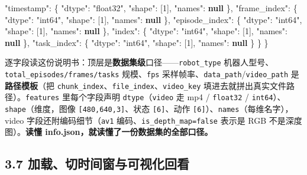 \documentclass[
  chinese,
]{ctexart}
\newenvironment{Shaded}{\begin{snugshade}}{\end{snugshade}}
\newcommand{\DataTypeTok}[1]{\textcolor[rgb]{0.68,0.00,0.00}{#1}}
\newcommand{\DecValTok}[1]{\textcolor[rgb]{0.68,0.00,0.00}{#1}}
\newcommand{\FunctionTok}[1]{\textcolor[rgb]{0.28,0.35,0.67}{#1}}
\newcommand{\KeywordTok}[1]{\textcolor[rgb]{0.00,0.23,0.31}{\textbf{#1}}}
\newcommand{\OtherTok}[1]{\textcolor[rgb]{0.00,0.23,0.31}{#1}}
\newcommand{\StringTok}[1]{\textcolor[rgb]{0.13,0.47,0.30}{#1}}
\begin{document}
\begin{Shaded}
\begin{Highlighting}[]
    \DataTypeTok{"timestamp"}\FunctionTok{:}     \FunctionTok{\{} \DataTypeTok{"dtype"}\FunctionTok{:} \StringTok{"float32"}\FunctionTok{,} \DataTypeTok{"shape"}\FunctionTok{:} \OtherTok{[}\DecValTok{1}\OtherTok{]}\FunctionTok{,} \DataTypeTok{"names"}\FunctionTok{:} \KeywordTok{null} \FunctionTok{\},}
    \DataTypeTok{"frame\_index"}\FunctionTok{:}   \FunctionTok{\{} \DataTypeTok{"dtype"}\FunctionTok{:} \StringTok{"int64"}\FunctionTok{,}   \DataTypeTok{"shape"}\FunctionTok{:} \OtherTok{[}\DecValTok{1}\OtherTok{]}\FunctionTok{,} \DataTypeTok{"names"}\FunctionTok{:} \KeywordTok{null} \FunctionTok{\},}
    \DataTypeTok{"episode\_index"}\FunctionTok{:} \FunctionTok{\{} \DataTypeTok{"dtype"}\FunctionTok{:} \StringTok{"int64"}\FunctionTok{,}   \DataTypeTok{"shape"}\FunctionTok{:} \OtherTok{[}\DecValTok{1}\OtherTok{]}\FunctionTok{,} \DataTypeTok{"names"}\FunctionTok{:} \KeywordTok{null} \FunctionTok{\},}
    \DataTypeTok{"index"}\FunctionTok{:}         \FunctionTok{\{} \DataTypeTok{"dtype"}\FunctionTok{:} \StringTok{"int64"}\FunctionTok{,}   \DataTypeTok{"shape"}\FunctionTok{:} \OtherTok{[}\DecValTok{1}\OtherTok{]}\FunctionTok{,} \DataTypeTok{"names"}\FunctionTok{:} \KeywordTok{null} \FunctionTok{\},}
    \DataTypeTok{"task\_index"}\FunctionTok{:}    \FunctionTok{\{} \DataTypeTok{"dtype"}\FunctionTok{:} \StringTok{"int64"}\FunctionTok{,}   \DataTypeTok{"shape"}\FunctionTok{:} \OtherTok{[}\DecValTok{1}\OtherTok{]}\FunctionTok{,} \DataTypeTok{"names"}\FunctionTok{:} \KeywordTok{null} \FunctionTok{\}}
  \FunctionTok{\}}
\FunctionTok{\}}
\end{Highlighting}
\end{Shaded}

逐字段读这份说明书：顶层是\textbf{数据集级}口径------\texttt{robot\_type}
机器人型号、\texttt{total\_episodes/frames/tasks} 规模、\texttt{fps}
采样帧率、\texttt{data\_path}/\texttt{video\_path}
是\textbf{路径模板}（把
\texttt{chunk\_index}、\texttt{file\_index}、\texttt{video\_key}
填进去就拼出真实文件路径）。\texttt{features} 里每个字段声明
\texttt{dtype}（\texttt{video} 走 mp4 / \texttt{float32} /
\texttt{int64}）、\texttt{shape}（维度，图像
\texttt{{[}480,640,3{]}}、状态 \texttt{{[}6{]}}、动作
\texttt{{[}6{]}}）、\texttt{names}（每维名字），video
字段还附编码细节（\texttt{av1} 编码、\texttt{is\_depth\_map=false}
表示是 RGB 不是深度图）。\textbf{读懂
info.json，就读懂了一份数据集的全部口径。}

\subsection{3.7
加载、切时间窗与可视化回看}\label{ux52a0ux8f7dux5207ux65f6ux95f4ux7a97ux4e0eux53efux89c6ux5316ux56deux770b}
\end{document}
